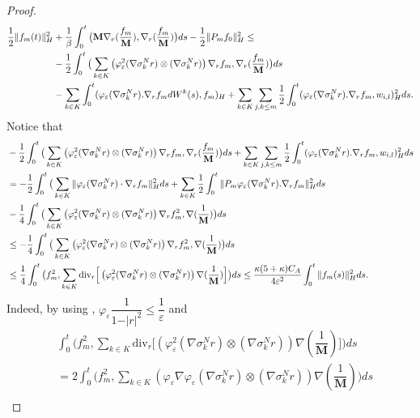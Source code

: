 \documentclass[10pt,a4paper]{amsart}
\newcommand{\Div}{\text{div}}
\begin{document}
\begin{proof}
\begin{align}
   \dfrac{1}{2} \Vert f_m(t)\Vert_H^2&+\dfrac{1}{\beta}\int_0^t\big(\mathbf{M}\nabla_r(\dfrac{f_m}{\mathbf{M}}),\nabla_r(\dfrac{f_m}{\mathbf{M}})\big)ds-\dfrac{1}{2}\Vert P_mf_{0}\Vert_H^2\le\notag\\
  &- \dfrac{1}{2}\int_0^t\big(\sum_{k\in K}\left(\varphi_\varepsilon^2(\nabla \sigma_k^Nr) \otimes (\nabla \sigma_k^Nr)\right) \nabla_rf_m,\nabla_r(\dfrac{f_m}{\mathbf{M}})\big)ds\label{ineq-estm-Galer}\\
            & -\sum_{k\in K}\int_0^t(\varphi_\varepsilon(\nabla \sigma_k^Nr).\nabla_rf_m dW^k(s),f_m)_H+ \sum_{k\in K}\sum_{j,k \le m}\dfrac{1}{2}\int_0^t(\varphi_\varepsilon(\nabla \sigma_k^Nr).\nabla_rf_m,w_{i,l})_H^2 ds.\notag
\end{align}
Notice that 
\begin{align}
    &- \dfrac{1}{2}\int_0^t\big(\sum_{k\in K}\left(\varphi_\varepsilon^2(\nabla \sigma_k^Nr) \otimes (\nabla \sigma_k^Nr)\right) \nabla_rf_m,\nabla_r(\dfrac{f_m}{\mathbf{M}})\big)ds+ \sum_{k\in K}\sum_{j,k \le m}\dfrac{1}{2}\int_0^t(\varphi_\varepsilon(\nabla \sigma_k^Nr).\nabla_rf_m,w_{i,l})_H^2 ds \notag\\
         &=- \dfrac{1}{2}\int_0^t\big(\sum_{k\in K}\Vert \varphi_\varepsilon (\nabla \sigma_k^Nr)\cdot\nabla_rf_m\Vert_H^2ds+ \sum_{k\in K}\dfrac{1}{2}\int_0^t\Vert P_m\varphi_\varepsilon(\nabla \sigma_k^Nr).\nabla_rf_m\Vert_H^2 ds\notag\\&-\dfrac{1}{4}\int_0^t\big(\sum_{k\in K}\left(\varphi_\varepsilon^2(\nabla \sigma_k^Nr) \otimes (\nabla \sigma_k^Nr)\right) \nabla_rf_m^2,\nabla(\dfrac{1}{\mathbf{M}})\big)ds\notag\\
        &\leq  -\dfrac{1}{4}\int_0^t\big(\sum_{k\in K}\left(\varphi_\varepsilon^2(\nabla \sigma_k^Nr) \otimes (\nabla \sigma_k^Nr)\right) \nabla_rf_m^2,\nabla(\dfrac{1}{\mathbf{M}})\big)ds\notag\\
        &\leq \dfrac{1}{4}\int_0^t\big(f_m^2, \sum_{k\in K} \Div_r\Big[\left(\varphi_\varepsilon^2(\nabla \sigma_k^Nr) \otimes (\nabla \sigma_k^Nr)\right)\nabla(\dfrac{1}{\mathbf{M}})\Big]\big)ds \leq  \dfrac{\kappa (5+\kappa)C_A}{4\varepsilon^2}\int_0^t\Vert f_m(s)\Vert_H^2 ds. \label{esti-cov-uniq}
\end{align}
Indeed,  by using ,  $\varphi_\varepsilon\dfrac{1}{1-\vert r\vert^2} \leq \dfrac{1}{\varepsilon}$  and  
\begin{align*} 
    &\int_0^t\big(f_m^2, \sum_{k\in K} \Div_r\Big[\left(\varphi_\varepsilon^2(\nabla \sigma_k^Nr) \otimes (\nabla \sigma_k^Nr)\right)\nabla(\dfrac{1}{\mathbf{M}})\Big]\big)ds\\&=2\int_0^t\big(f_m^2, \sum_{k\in K} \left(\varphi_\varepsilon \nabla \varphi_\varepsilon(\nabla \sigma_k^Nr) \otimes (\nabla \sigma_k^Nr)\right)\nabla(\dfrac{1}{\mathbf{M}})\big)ds\\

\end{align*}
\end{proof}
\end{document}
